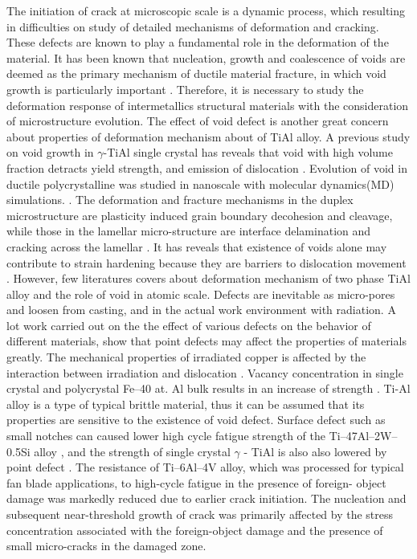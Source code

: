 \documentclass[metals,article,submit,moreauthors,pdftex,10pt,a4paper]{Definitions/mdpi}
\begin{document}
The initiation of crack at microscopic scale is a dynamic process, which resulting in difficulties on study of detailed mechanisms of deformation and cracking. These defects are known to play a fundamental role in the deformation of the material. It has been known that nucleation, growth and coalescence of voids are deemed as the primary mechanism of ductile material fracture, in which void growth is particularly important \cite{Hempel2017a}. Therefore, it is necessary to study the deformation response of intermetallics structural materials with the consideration of microstructure evolution. The effect of void defect is another great concern about properties of deformation mechanism about of TiAl alloy. A previous study on void growth in $\gamma$-TiAl single crystal has reveals that void with high volume fraction detracts yield strength, and emission of dislocation \cite{Tang2014, Xu2011}. Evolution of void in ductile polycrystalline was studied in nanoscale with molecular dynamics(MD) simulations. \cite{Jing2018a,Elkhateeb2018}. The deformation and fracture mechanisms in the duplex microstructure are plasticity induced grain boundary decohesion and cleavage, while those in the lamellar micro-structure are interface delamination and cracking across the lamellar \cite{Tang2014}. It has reveals that existence of voids alone may contribute to strain hardening because they are barriers to dislocation movement \cite{Xiong2015}. However, few literatures covers about deformation mechanism of two phase TiAl alloy and the role of void in atomic scale. Defects are inevitable as micro-pores and loosen from casting, and in the actual work environment with radiation. A lot work carried out on the the effect of various defects on the behavior of different materials, show that point defects may affect the properties of materials greatly. The mechanical properties of irradiated copper is affected by the interaction between irradiation and dislocation \cite{Kiener2011}. Vacancy concentration in single crystal and polycrystal Fe–40 at. Al bulk results in an increase of strength \cite{Yang1998}. Ti-Al alloy is a type of typical brittle material, thus it can be assumed that its properties are sensitive to the existence of void defect. Surface defect such as small notches can caused lower high cycle fatigue strength of the Ti–47Al–2W–0.5Si alloy \cite{Nazmy2001}, and the strength of single crystal $\gamma$ - TiAl is also also lowered by point defect \cite{Wu2016}. The resistance of Ti–6Al–4V alloy, which was processed for typical fan blade applications, to high-cycle fatigue in the presence of foreign- object damage was markedly reduced due to earlier crack initiation.  The nucleation and subsequent near-threshold growth of crack was primarily affected by the stress concentration associated with the foreign-object damage and the presence of small micro-cracks in the damaged zone.
\end{document}
